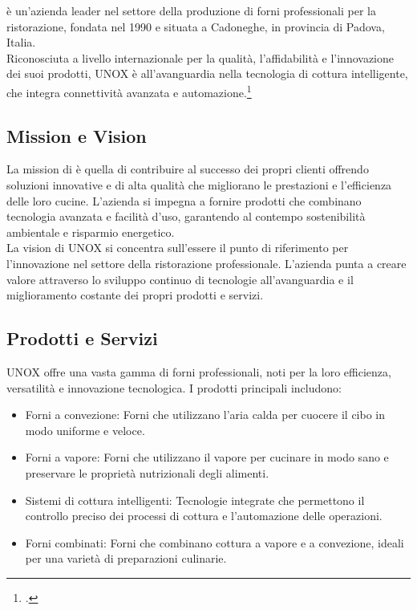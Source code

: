 \myAzienda è un'azienda leader nel settore della produzione di forni professionali per la ristorazione, fondata nel 1990 e situata a Cadoneghe, in provincia di Padova, Italia.
\\Riconosciuta a livello internazionale per la qualità, l'affidabilità e l'innovazione dei suoi prodotti, UNOX è all'avanguardia nella tecnologia di cottura intelligente, che integra connettività avanzata e automazione.\footcite{site:unox_sito}

\subsection{Mission e Vision}
La mission di \myAzienda è quella di contribuire al successo dei propri clienti offrendo soluzioni innovative e di alta qualità che migliorano le prestazioni e l'efficienza delle loro cucine.
L'azienda si impegna a fornire prodotti che combinano tecnologia avanzata e facilità d'uso, garantendo al contempo sostenibilità ambientale e risparmio energetico.
\\La vision di UNOX si concentra sull'essere il punto di riferimento per l'innovazione nel settore della ristorazione professionale.
L'azienda punta a creare valore attraverso lo sviluppo continuo di tecnologie all'avanguardia e il miglioramento costante dei propri prodotti e servizi.

\subsection{Prodotti e Servizi}
UNOX offre una vasta gamma di forni professionali, noti per la loro efficienza, versatilità e innovazione tecnologica.
I prodotti principali includono:
\begin{itemize}
    \item Forni a convezione: Forni che utilizzano l'aria calda per cuocere il cibo in modo uniforme e veloce.
    \item Forni a vapore: Forni che utilizzano il vapore per cucinare in modo sano e preservare le proprietà nutrizionali degli alimenti.
    \item Sistemi di cottura intelligenti: Tecnologie integrate che permettono il controllo preciso dei processi di cottura e l'automazione delle operazioni.
    \item Forni combinati: Forni che combinano cottura a vapore e a convezione, ideali per una varietà di preparazioni culinarie.
\end{itemize}

